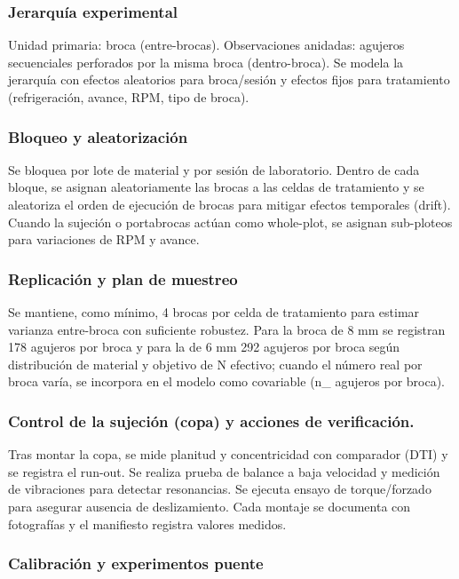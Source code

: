 \documentclass[12pt, letterpaper]{report}
\begin{document}
\subsubsection{Jerarquía experimental}

Unidad primaria: broca (entre-brocas). Observaciones anidadas: agujeros secuenciales perforados por la misma broca (dentro-broca). Se modela la jerarquía con efectos aleatorios para broca/sesión y efectos fijos para tratamiento (refrigeración, avance, RPM, tipo de broca).

\subsubsection{Bloqueo y aleatorización}

Se bloquea por lote de material y por sesión de laboratorio. Dentro de cada bloque, se asignan aleatoriamente las brocas a las celdas de tratamiento y se aleatoriza el orden de ejecución de brocas para mitigar efectos temporales (drift). Cuando la sujeción o portabrocas actúan como whole-plot, se asignan sub-ploteos para variaciones de RPM y avance.

\subsubsection{Replicación y plan de muestreo}

Se mantiene, como mínimo, 4 brocas por celda de tratamiento para estimar varianza entre-broca con suficiente robustez. Para la broca de 8 mm se registran 178 agujeros por broca y para la de 6 mm 292 agujeros por broca según distribución de material y objetivo de N efectivo; cuando el número real por broca varía, se incorpora en el modelo como covariable (n\_ agujeros por broca).

\subsubsection{Control de la sujeción (copa) y acciones de verificación.}

Tras montar la copa, se mide planitud y concentricidad con comparador (DTI) y se registra el run-out. Se realiza prueba de balance a baja velocidad y medición de vibraciones para detectar resonancias. Se ejecuta ensayo de torque/forzado para asegurar ausencia de deslizamiento. Cada montaje se documenta con fotografías y el manifiesto registra valores medidos.

\subsubsection{Calibración y experimentos puente}
\end{document}
